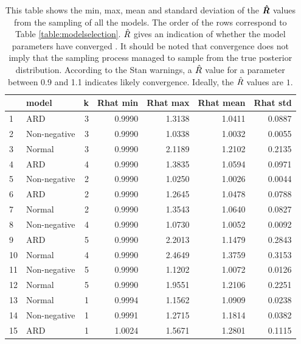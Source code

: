 \documentclass[12pt]{article}
\begin{document}
    \begin{table}[H]
        \centering
        \caption{This table shows the min, max, mean and standard deviation of the $\boldsymbol{\hat{R}}$ values from the sampling of all the models. The order of the rows correspond to Table \ref{table:modelselection}. $\hat{R}$ gives an indication of whether the model parameters have converged \cite{Rhat}. It should be noted that convergence does not imply that the sampling process managed to sample from the true posterior distribution. According to the Stan warnings, a $\hat{R}$ value for a parameter between 0.9 and 1.1 indicates likely convergence. Ideally, the $\hat{R}$ values are $1$.}
        \label{table:rhats}
        \begin{tabular}{llr|rr|rr}
            \toprule
            {} &         model &  k &  Rhat min &  Rhat max &  Rhat mean &  Rhat std \\
            \midrule
            1  &           ARD &  3 &    0.9990 &    1.3138 &     1.0411 &    0.0887 \\
            2  &  Non-negative &  3 &    0.9990 &    1.0338 &     1.0032 &    0.0055 \\
            3  &        Normal &  3 &    0.9990 &    2.1189 &     1.2102 &    0.2135 \\
            4  &           ARD &  4 &    0.9990 &    1.3835 &     1.0594 &    0.0971 \\
            5  &  Non-negative &  2 &    0.9990 &    1.0250 &     1.0026 &    0.0044 \\
            6  &           ARD &  2 &    0.9990 &    1.2645 &     1.0478 &    0.0788 \\
            7  &        Normal &  2 &    0.9990 &    1.3543 &     1.0640 &    0.0827 \\
            8  &  Non-negative &  4 &    0.9990 &    1.0730 &     1.0052 &    0.0092 \\
            9  &           ARD &  5 &    0.9990 &    2.2013 &     1.1479 &    0.2843 \\
            10 &        Normal &  4 &    0.9990 &    2.4649 &     1.3759 &    0.3153 \\
            11 &  Non-negative &  5 &    0.9990 &    1.1202 &     1.0072 &    0.0126 \\
            12 &        Normal &  5 &    0.9990 &    1.9551 &     1.2106 &    0.2251 \\
            13 &        Normal &  1 &    0.9994 &    1.1562 &     1.0909 &    0.0238 \\
            14 &  Non-negative &  1 &    0.9991 &    1.2715 &     1.1814 &    0.0382 \\
            15 &           ARD &  1 &    1.0024 &    1.5671 &     1.2801 &    0.1115 \\
            \bottomrule
        \end{tabular}
    \end{table}
\end{document}

